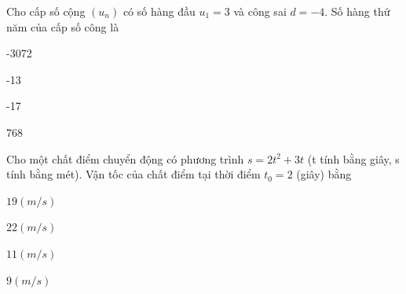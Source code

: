 \begin{question}[type=multiple_choice,difficulty=1,code={I-3}]
Cho cấp số cộng $ (u_n) $ có số hàng đầu $ u_1 = 3 $ và công sai $ d = -4 $. Số hàng thứ năm của cấp số công là

\begin{choice}[label=A]
-3072
\end{choice}

\begin{choice}[correct,label=B]
-13
\end{choice}

\begin{choice}[label=C]
-17
\end{choice}

\begin{choice}[label=D]
768
\end{choice}

\end{question}

\begin{question}[type=multiple_choice,difficulty=2,code={I-4}]
Cho một chất điểm chuyển động có phương trình $s = 2t^2 + 3t$ (t tính bằng giây, s tính bằng mét). Vận tốc của chất điểm tại thời điểm $t_0 = 2$ (giây) bằng

\begin{choice}[label=A]
$19(m/s)$
\end{choice}

\begin{choice}[label=B]
$22(m/s)$
\end{choice}

\begin{choice}[correct,label=C]
$11(m/s)$
\end{choice}

\begin{choice}[label=D]
$9(m/s)$
\end{choice}

\end{question}

